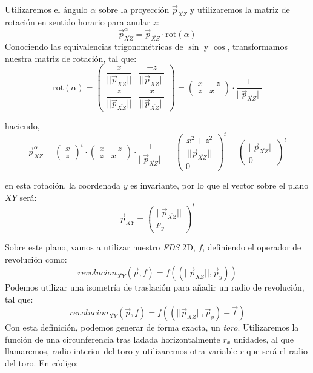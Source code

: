 Utilizaremos el ángulo \(\alpha\) sobre la proyección \(\Vec{p}_{\overline{XZ}}\) y utilizaremos la matriz de rotación en sentido horario para anular \(z\):
\[\Vec{p}_{\overline{XZ}}^{\alpha}=\Vec{p}_{\overline{XZ}}\cdot\text{rot}(\alpha)
\]
Conociendo las equivalencias trigonométricas de \(\sin\) y \(\cos\), transformamos nuestra matriz de rotación, tal que:
\[
\text{rot}(\alpha)=\begin{pmatrix}
    \dfrac{x}{\vert\vert\Vec{p}_{\overline{XZ}}\vert\vert} & \dfrac{-z}{\vert\vert\Vec{p}_{\overline{XZ}}\vert\vert}\\
    \dfrac{z}{\vert\vert\Vec{p}_{\overline{XZ}}\vert\vert} & \dfrac{x}{\vert\vert\Vec{p}_{\overline{XZ}}\vert\vert}
\end{pmatrix}=\begin{pmatrix}
    x & -z\\
    z & x
\end{pmatrix}\cdot\dfrac{1}{\vert\vert\Vec{p}_{\overline{XZ}}\vert\vert}
\]

haciendo,
\[\Vec{p}_{\overline{XZ}}^{\alpha}=\begin{pmatrix}
    x\\
    z
\end{pmatrix}^t\cdot\begin{pmatrix}
    x & -z\\
    z & x
\end{pmatrix}\cdot\dfrac{1}{\vert\vert\Vec{p}_{\overline{XZ}}\vert\vert}=\begin{pmatrix}
    \dfrac{x^2 + z^2}{\vert\vert\Vec{p}_{\overline{XZ}}\vert\vert}\\
    0
\end{pmatrix}^t=\begin{pmatrix}
    \vert\vert\Vec{p}_{\overline{XZ}}\vert\vert\\
    0
\end{pmatrix}^t\]

en esta rotación, la coordenada \(y\) es invariante, por lo que el vector sobre el plano \(\overline{XY}\) será:
\[ \Vec{p}_{\overline{XY}}=\begin{pmatrix}
    \vert\vert\Vec{p}_{\overline{XZ}}\vert\vert\\
    p_{y}
\end{pmatrix}^t\]

Sobre este plano, vamos a utilizar nuestro \textit{FDS} 2D, \(f\), definiendo el operador de revolución como:
\[\textit{revolucion}_{\overline{XY}}(\Vec{p}, f)=f((\vert\vert \Vec{p}_{\overline{XZ}} \vert\vert, \Vec{p}_y))\]
Podemos utilizar una isometría de traslación  para añadir un radio de revolución, tal que:
\[\textit{revolucion}_{\overline{XY}}(\Vec{p}, f)=f((\vert\vert \Vec{p}_{\overline{XZ}} \vert\vert, \Vec{p}_y)-\Vec{t})\]
Con esta definición, podemos generar de forma exacta, un \textit{toro}. Utilizaremos la función de una circunferencia tras ladada horizontalmente \(r_x\) unidades, al que llamaremos, radio interior del toro y utilizaremos otra variable \(r\) que será el radio del toro. En código:


